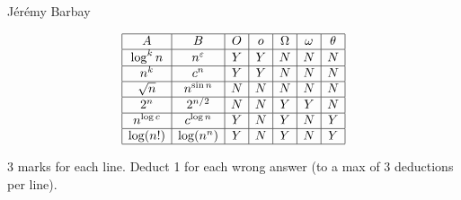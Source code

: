 \begin{solution}
\begin{authorship}J\'er\'emy Barbay\end{authorship}
$$
\begin{array}{|c|c|c|c|c|c|c|}\hline
  A          &	B               &   O   &   o   & \Omega&\omega &\theta \\	\hline
 \log^{k}n     &n^{\varepsilon }  &   Y	&   Y 	&  N	&  N	&  N	\\	\hline 
 n^{k}       &	c^{n}           &   Y	&   Y	&  N	&  N	&  N	\\	\hline 
 \sqrt{n}    &	n ^{\sin n}     &   N	&   N	&  N	&  N	&  N	\\	\hline 
 2^{n}       &	2^{n/2}         &   N 	&   N	&  Y 	&  Y	&  N	\\	\hline 
 n^{\log c}   &	c^{\log n}       &   Y	&   N	&  Y	&  N	&  Y	\\	\hline 
 \log(n!)      &	\log (n^{n})     &   Y	&   N	&  Y	&  N	&  Y	\\	\hline 
\end{array}
$$
\end{solution}
\begin{markingScheme}
3 marks for each line.  Deduct 1 for each wrong answer (to a max of
3 deductions per line).
\end{markingScheme}
